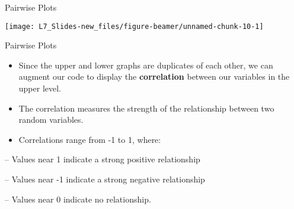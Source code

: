\documentclass[ignorenonframetext,]{beamer}
\begin{document}
\begin{frame}{Pairwise Plots}

\small

\begin{center}\texttt{[image: L7\_Slides-new\_files/figure-beamer/unnamed-chunk-10-1]} \end{center}

\end{frame}

\begin{frame}{Pairwise Plots}

\begin{itemize}
\item
  Since the upper and lower graphs are duplicates of each other, we can
  augment our code to display the \textbf{correlation} between our
  variables in the upper level.
\item
  The correlation measures the strength of the relationship between two
  random variables.
\item
  Correlations range from -1 to 1, where:
\end{itemize}

-- Values near 1 indicate a strong positive relationship

-- Values near -1 indicate a strong negative relationship

-- Values near 0 indicate no relationship.

\end{frame}
\end{document}
